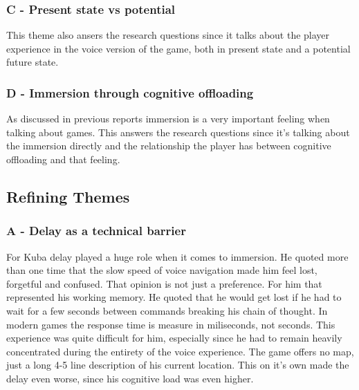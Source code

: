 \subsubsection{C - Present state vs potential}


This theme also ansers the research questions since it talks about the player experience in the voice version of the game, both in present state and a potential future state.

\subsubsection{D - Immersion through cognitive offloading}


As discussed in previous reports immersion is a very important feeling when talking about games. This answers the research questions since it's talking about the immersion directly and the relationship the player has between cognitive offloading and that feeling. 



\subsection{Refining Themes}

\subsubsection{A - Delay as a technical barrier}

For Kuba delay played a huge role when it comes to immersion. He quoted more than one time that the slow speed of voice navigation made him feel lost, forgetful and confused. That opinion is not just a preference. For him that represented his working memory. He quoted that he would get lost if he had to wait for a few seconds between commands breaking his chain of thought. In modern games the response time is measure in miliseconds, not seconds. This experience was quite difficult for him, especially since he had to remain heavily concentrated during the entirety of the voice experience. The game offers no map, just a long 4-5 line description of his current location. This on it's own made the delay even worse, since his cognitive load was even higher. 

